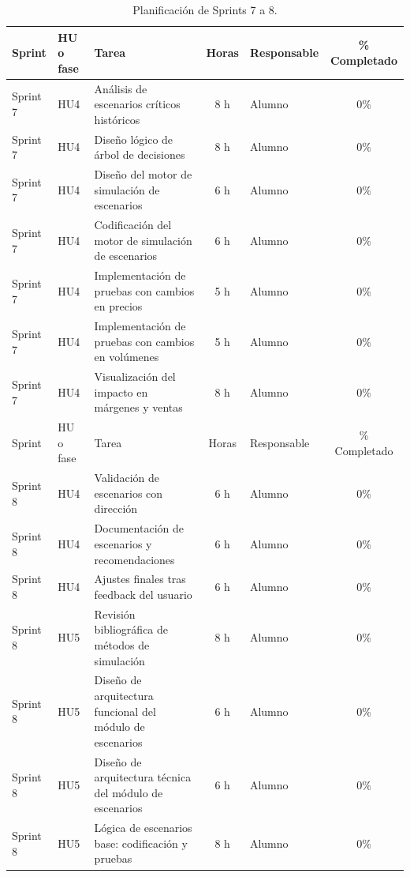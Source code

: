 \documentclass[
11pt, %
]{charter}
\begin{document}
\begin{table}[htpb]
\centering
\caption{Planificación de Sprints 7 a 8.}
\begin{tabularx}{\linewidth}{@{}|l|l|X|c|l|c|@{}}
\hline
\rowcolor[HTML]{C0C0C0}
Sprint & HU o fase & Tarea & Horas & Responsable & \% Completado \\ \hline
Sprint 7 & HU4 & Análisis de escenarios críticos históricos & 8 h & Alumno & 0\% \\ \hline
Sprint 7 & HU4 & Diseño lógico de árbol de decisiones & 8 h & Alumno & 0\% \\ \hline
Sprint 7 & HU4 & Diseño del motor de simulación de escenarios & 6 h & Alumno & 0\% \\ \hline
Sprint 7 & HU4 & Codificación del motor de simulación de escenarios & 6 h & Alumno & 0\% \\ \hline
Sprint 7 & HU4 & Implementación de pruebas con cambios en precios & 5 h & Alumno & 0\% \\ \hline
Sprint 7 & HU4 & Implementación de pruebas con cambios en volúmenes & 5 h & Alumno & 0\% \\ \hline
Sprint 7 & HU4 & Visualización del impacto en márgenes y ventas & 8 h & Alumno & 0\% \\ \hline
\hline
Sprint & HU o fase & Tarea & Horas & Responsable & \% Completado \\ \hline
Sprint 8 & HU4 & Validación de escenarios con dirección & 6 h & Alumno & 0\% \\ \hline
Sprint 8 & HU4 & Documentación de escenarios y recomendaciones & 6 h & Alumno & 0\% \\ \hline
Sprint 8 & HU4 & Ajustes finales tras feedback del usuario & 6 h & Alumno & 0\% \\ \hline
Sprint 8 & HU5 & Revisión bibliográfica de métodos de simulación & 8 h & Alumno & 0\% \\ \hline
Sprint 8 & HU5 & Diseño de arquitectura funcional del módulo de escenarios & 6 h & Alumno & 0\% \\ \hline
Sprint 8 & HU5 & Diseño de arquitectura técnica del módulo de escenarios & 6 h & Alumno & 0\% \\ \hline
Sprint 8 & HU5 & Lógica de escenarios base: codificación y pruebas & 8 h & Alumno & 0\% \\ \hline
\end{tabularx}
\end{table}
\end{document}
